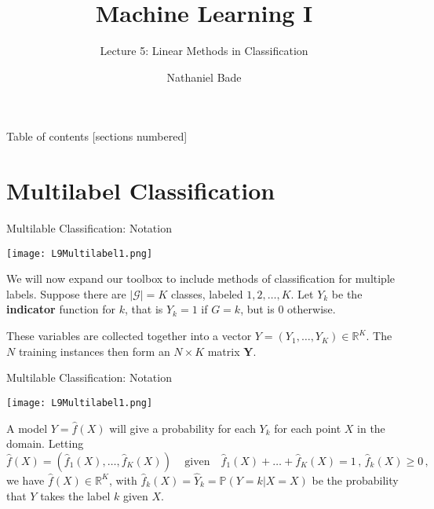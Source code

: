 \documentclass[10pt, table, dvipsnames,xcdraw, handout]{beamer}
\title{Machine Learning I}
\subtitle{Lecture 5: Linear Methods in Classification}
\date{}
\author{Nathaniel Bade}
\institute{Northeastern University Department of Mathematics}
\newcommand{\cG}{\ensuremath{\mathcal{G}}}
\begin{document}
\maketitle

\begin{frame}{Table of contents}
  [sections numbered]
  \tableofcontents[hideallsubsections]
\end{frame}




\section{Multilabel Classification}

\begin{frame}[fragile]{Multilable Classification: Notation}
  \begin{minipage}[t][0.5\textheight][t]{\textwidth}
	\centering \texttt{[image: L9Multilabel1.png]} 
  \end{minipage}
  \vfill
\begin{minipage}[t][0.5\textheight][t]{\textwidth}
We will now expand our toolbox to include methods of classification for multiple labels. \pause Suppose there are $|\cG| = K$ classes, labeled $1,2,\ldots, K$. Let $Y_k$ be the \textbf{indicator} function for $k$, that is $Y_k = 1$ if $G= k$, but is 0 otherwise. \pause

These variables are collected together into a vector  $Y = (Y_1,\ldots, Y_K)\in \mathbb{R}^K$. The $N$ training instances then form an $N\times K$ matrix $\mathbf{Y}$.  
\end{minipage}
\end{frame}


\begin{frame}[fragile]{Multilable Classification: Notation}
  \begin{minipage}[t][0.5\textheight][t]{\textwidth}
	\centering \texttt{[image: L9Multilabel1.png]} 
  \end{minipage}
  \vfill
\begin{minipage}[t][0.5\textheight][t]{\textwidth}
A model $Y = \hat{f}(X)$ will give a probability for each $Y_k$ for each point $X$ in the domain. Letting
$$
\hat{f}(X) = (\hat f_1(X),\ldots, \hat f_K(X))\,\hspace{1em}\text{given}\hspace{1em} \hat f_1(X)+\ldots+ \hat f_K(X) = 1\,,\, \hat f_k(X)\geq0\,,
$$
we have $\hat{f}(X)\in \mathbb{R}^K$, with $\hat{f}_k(X) = \hat{Y}_k = \mathbb{P}(Y = k| X = X)$ be the probability that $Y$ takes the label $k$ given $X$.
\end{minipage}
\end{frame}
\end{document}

